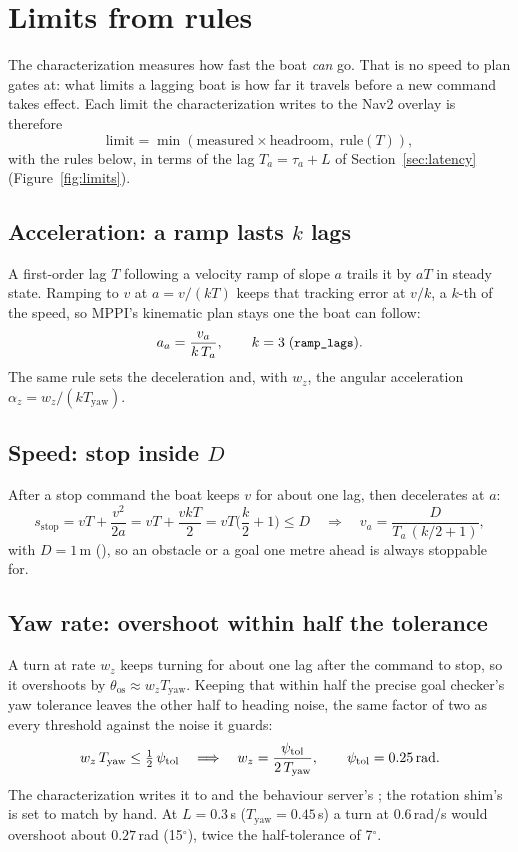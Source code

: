 \section{Limits from rules}
\label{sec:limits}

The characterization measures how fast the boat \emph{can} go. That is no speed to plan gates
at: what limits a lagging boat is how far it travels before a new command takes effect. Each
limit the characterization writes to the Nav2 overlay is therefore
\[
  \text{limit} = \min(\text{measured} \times \text{headroom},\; \text{rule}(T)),
\]
with the rules below, in terms of the lag $T_a = \tau_a + L$ of Section~\ref{sec:latency}
(Figure~\ref{fig:limits}).

\subsection{Acceleration: a ramp lasts $k$ lags}
A first-order lag $T$ following a velocity ramp of slope $a$ trails it by $aT$ in steady state.
Ramping to $v$ at $a = v/(kT)$ keeps that tracking error at $v/k$, a $k$-th of the speed, so
MPPI's kinematic plan stays one the boat can follow:
\[
  a_a = \frac{v_a}{k\,T_a},\qquad k = 3 \;(\texttt{\small ramp\_lags}).
\]
The same rule sets the deceleration and, with $w_z$, the angular acceleration
$\alpha_z = w_z/(k T_\text{yaw})$.

\subsection{Speed: stop inside $D$}
After a stop command the boat keeps $v$ for about one lag, then decelerates at $a$:
\[
  s_\text{stop} = vT + \frac{v^2}{2a} = vT + \frac{v k T}{2} = vT\Big(\frac{k}{2} + 1\Big) \le D
  \quad\Longrightarrow\quad
  v_a = \frac{D}{T_a\,(k/2 + 1)},
\]
with $D = 1$\,m (), so an obstacle or a goal one metre ahead is always
stoppable for.

\subsection{Yaw rate: overshoot within half the tolerance}
A turn at rate $w_z$ keeps turning for about one lag after the command to stop, so it
overshoots by $\theta_\text{os} \approx w_z T_\text{yaw}$. Keeping that within half the precise
goal checker's yaw tolerance leaves the other half to heading noise, the same factor of two as
every threshold against the noise it guards:
\[
  w_z\,T_\text{yaw} \le \tfrac12\,\psi_\text{tol}
  \quad\Longrightarrow\quad
  w_z = \frac{\psi_\text{tol}}{2\,T_\text{yaw}},\qquad \psi_\text{tol} = 0.25\text{\,rad}.
\]
The characterization writes it to  and the behaviour server's
; the rotation shim's  is set
to match by hand. At $L = 0.3$\,s ($T_\text{yaw} = 0.45$\,s) a turn at 0.6\,rad/s would overshoot
about $0.27$\,rad (15$^\circ$), twice the half-tolerance of 7$^\circ$.

